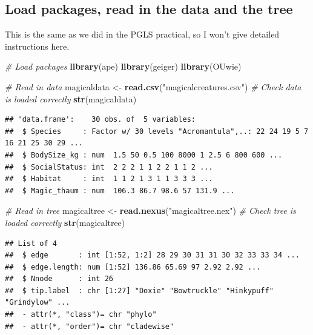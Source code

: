 \documentclass[]{book}
\newenvironment{Shaded}{\begin{snugshade}}{\end{snugshade}}
\newcommand{\KeywordTok}[1]{\textcolor[rgb]{0.13,0.29,0.53}{\textbf{{#1}}}}
\newcommand{\StringTok}[1]{\textcolor[rgb]{0.31,0.60,0.02}{{#1}}}
\newcommand{\CommentTok}[1]{\textcolor[rgb]{0.56,0.35,0.01}{\textit{{#1}}}}
\newcommand{\NormalTok}[1]{{#1}}
\begin{document}
\subsection{Load packages, read in the data and the
tree}\label{load-packages-read-in-the-data-and-the-tree-1}

This is the same as we did in the PGLS practical, so I won't give
detailed instructions here.

\begin{Shaded}
\begin{Highlighting}[]
\CommentTok{# Load packages}
\KeywordTok{library}\NormalTok{(ape)}
\KeywordTok{library}\NormalTok{(geiger)}
\KeywordTok{library}\NormalTok{(OUwie)}
\end{Highlighting}
\end{Shaded}

\begin{Shaded}
\begin{Highlighting}[]
\CommentTok{# Read in data}
\NormalTok{magicaldata <-}\StringTok{ }\KeywordTok{read.csv}\NormalTok{(}\StringTok{"magicalcreatures.csv"}\NormalTok{)}
\CommentTok{# Check data is loaded correctly}
\KeywordTok{str}\NormalTok{(magicaldata)}
\end{Highlighting}
\end{Shaded}

\begin{verbatim}
## 'data.frame':    30 obs. of  5 variables:
##  $ Species     : Factor w/ 30 levels "Acromantula",..: 22 24 19 5 7 16 21 25 30 29 ...
##  $ BodySize_kg : num  1.5 50 0.5 100 8000 1 2.5 6 800 600 ...
##  $ SocialStatus: int  2 2 2 1 1 2 2 1 1 2 ...
##  $ Habitat     : int  1 1 2 1 3 1 1 3 3 3 ...
##  $ Magic_thaum : num  106.3 86.7 98.6 57 131.9 ...
\end{verbatim}

\begin{Shaded}
\begin{Highlighting}[]
\CommentTok{# Read in tree}
\NormalTok{magicaltree <-}\StringTok{ }\KeywordTok{read.nexus}\NormalTok{(}\StringTok{"magicaltree.nex"}\NormalTok{) }
\CommentTok{# Check tree is loaded correctly}
\KeywordTok{str}\NormalTok{(magicaltree)}
\end{Highlighting}
\end{Shaded}

\begin{verbatim}
## List of 4
##  $ edge       : int [1:52, 1:2] 28 29 30 31 31 30 32 33 33 34 ...
##  $ edge.length: num [1:52] 136.86 65.69 97 2.92 2.92 ...
##  $ Nnode      : int 26
##  $ tip.label  : chr [1:27] "Doxie" "Bowtruckle" "Hinkypuff" "Grindylow" ...
##  - attr(*, "class")= chr "phylo"
##  - attr(*, "order")= chr "cladewise"
\end{verbatim}
\end{document}

